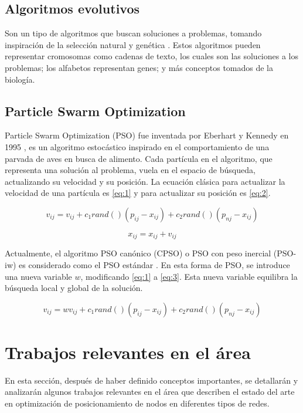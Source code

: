 \documentclass[letterpaper]{report}
\begin{document}
  \subsection{Algoritmos evolutivos}
    Son un tipo de algoritmos que buscan soluciones a problemas, tomando
    inspiración de la selección natural y genética \cite{EADef,GADef}. Estos 
    algoritmos pueden representar cromosomas como cadenas de texto, los cuales 
    son las soluciones a los problemas; los alfabetos representan genes; y más
    conceptos tomados de la biología.

  \subsection{Particle Swarm Optimization}\label{subsec:pso}
    Particle Swarm Optimization (PSO) fue inventada por Eberhart y Kennedy en
    1995 \cite{PSODef}, es un algoritmo
    estocástico inspirado en el comportamiento de una parvada de aves en busca
    de alimento. Cada partícula en el algoritmo, que representa una solución al
    problema, vuela en el espacio de búsqueda, actualizando su velocidad y su
    posición. La ecuación clásica para actualizar la velocidad de una partícula
    es \ref{eq:1} y para actualizar su posición es \ref{eq:2}.

    \begin{equation}
      \label{eq:1}
      v_{ij} = v_{ij} + c_1 rand()(p_{ij} - x_{ij}) + c_2 rand()(p_{nj} - x_{ij})
    \end{equation}

    \begin{equation}
      \label{eq:2}
      x_{ij} = x_{ij} + v_{ij}
    \end{equation}

    Actualmente, el algoritmo PSO canónico (CPSO) o PSO con peso inercial
    (PSO-iw) es considerado como el PSO estándar \cite{CPSO,PSOReview}.
    En esta forma de PSO, se introduce una nueva variable $w$, modificando
    \ref{eq:1} a \ref{eq:3}. Esta nueva variable equilibra la búsqueda local y
    global de la solución.

    \begin{equation}
      \label{eq:3}
      v_{ij} = w v_{ij} + c_1 rand()(p_{ij} - x_{ij}) + c_2 rand()(p_{nj} - x_{ij})
    \end{equation}

\section{Trabajos relevantes en el área}
  En esta sección, después de haber definido conceptos importantes, se
  detallarán y analizarán algunos trabajos relevantes en el área que describen
  el estado del arte en optimización de posicionamiento de nodos en diferentes
  tipos de redes.
\end{document}
